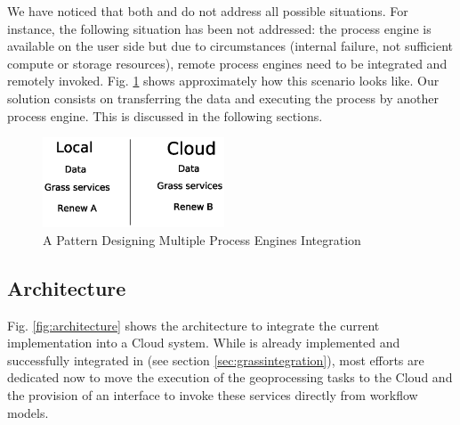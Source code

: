
We have noticed that both \cite{han10} and \cite{leyman09} do not address all possible situations.
%
For instance, the following situation has been not addressed: the process engine is available on the user side but due to circumstances (internal failure, not sufficient compute or storage resources), remote process engines need to be integrated and remotely invoked.
%
Fig. \ref{fig:pattern5} shows approximately how this scenario looks like.
%
Our solution consists on transferring the data and executing the process by another process engine.
%
This is discussed in the following sections. 
%
% 
%
%
\begin{figure}[!t]
    \centering
  \includegraphics[width=0.48\textwidth,height=0.10\textheight]{pattern5}
\caption{A Pattern Designing Multiple Process Engines Integration}
\label{fig:pattern5}
\end{figure}

\subsection{Architecture}
%
Fig. \ref{fig:architecture} shows the architecture to integrate the current implementation into a Cloud system.
%
While \RenewGrass{} is already implemented and successfully integrated in \Renew{} (see section \ref{sec:grassintegration}), most efforts are dedicated now to move the execution of the geoprocessing tasks to the Cloud and the provision of an interface to invoke these services  directly from workflow models.

